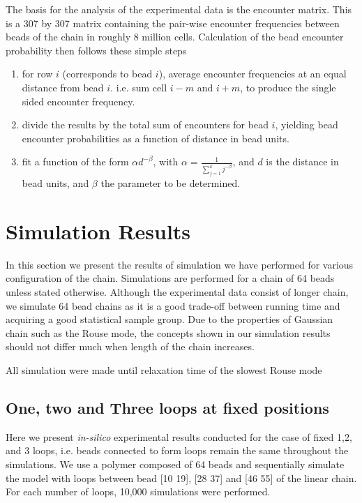 \documentclass[12pt]{paper}
\begin{document}
The basis for the analysis of the experimental data is the encounter matrix. This is a 307 by 307 matrix containing the pair-wise encounter frequencies between beads of the chain in roughly 8 million cells. Calculation of the bead encounter probability then follows these simple steps
\begin{enumerate}
\item for row $i$ (corresponds to bead $i$), average encounter frequencies at an equal distance from bead $i$. i.e. sum cell $i-m$ and $i+m$, to produce the single sided encounter frequency.
\item divide the results by the total sum of encounters for bead $i$, yielding bead encounter probabilities as a function of distance in bead units. 
\item fit a function of the form $\alpha d^{-\beta}$, with $\alpha = \frac{1}{\sum_{j=1}^k j^{-\beta}}$, and $d$ is the distance in bead units, and $\beta$ the parameter to be determined.
\end{enumerate}
     
\section{Simulation Results}
In this section we present the results of simulation we have performed for various configuration of the chain. 
Simulations are performed for a chain of 64 beads unless stated otherwise. Although the experimental data consist of longer chain, we simulate 64 bead chains as it is a good trade-off between running time and acquiring a good statistical sample group. Due to the properties of Gaussian chain such as the Rouse mode, the concepts shown in our simulation results should not differ much when length of the chain increases.

All simulation were made until relaxation time of the slowest Rouse mode

\subsection{One, two and Three loops at fixed positions}
Here we present \textit{in-silico} experimental results conducted for the case of fixed 1,2, and 3 loops, i.e. beads connected to form loops remain the same throughout the simulations. We use a polymer composed of 64 beads and sequentially simulate the model with loops between bead [10 19], [28 37] and  [46 55] of the linear chain. For each number of loops, 10,000 simulations were performed.
\end{document}
